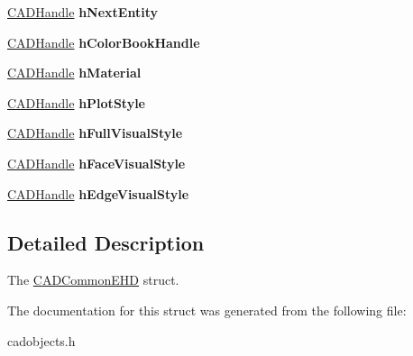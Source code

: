 \begin{DoxyCompactItemize}
\item 
\hyperlink{class_c_a_d_handle}{C\+A\+D\+Handle} {\bfseries h\+Next\+Entity}\hypertarget{struct_c_a_d_common_e_h_d_ac566a87a33ed49b272b8647fcd54a4b7}{}\label{struct_c_a_d_common_e_h_d_ac566a87a33ed49b272b8647fcd54a4b7}

\item 
\hyperlink{class_c_a_d_handle}{C\+A\+D\+Handle} {\bfseries h\+Color\+Book\+Handle}\hypertarget{struct_c_a_d_common_e_h_d_a94a69a18e50c11a6d08ab9cd23ffafe5}{}\label{struct_c_a_d_common_e_h_d_a94a69a18e50c11a6d08ab9cd23ffafe5}

\item 
\hyperlink{class_c_a_d_handle}{C\+A\+D\+Handle} {\bfseries h\+Material}\hypertarget{struct_c_a_d_common_e_h_d_a9ebf2ff0ac69686bd6d818362245021d}{}\label{struct_c_a_d_common_e_h_d_a9ebf2ff0ac69686bd6d818362245021d}

\item 
\hyperlink{class_c_a_d_handle}{C\+A\+D\+Handle} {\bfseries h\+Plot\+Style}\hypertarget{struct_c_a_d_common_e_h_d_afe482d65b2cba4333eb074f8aa4408f6}{}\label{struct_c_a_d_common_e_h_d_afe482d65b2cba4333eb074f8aa4408f6}

\item 
\hyperlink{class_c_a_d_handle}{C\+A\+D\+Handle} {\bfseries h\+Full\+Visual\+Style}\hypertarget{struct_c_a_d_common_e_h_d_a8f04a2c251fe0d108bb15af536a31420}{}\label{struct_c_a_d_common_e_h_d_a8f04a2c251fe0d108bb15af536a31420}

\item 
\hyperlink{class_c_a_d_handle}{C\+A\+D\+Handle} {\bfseries h\+Face\+Visual\+Style}\hypertarget{struct_c_a_d_common_e_h_d_ae6f83c99d7023cc1634abd0709fb48c3}{}\label{struct_c_a_d_common_e_h_d_ae6f83c99d7023cc1634abd0709fb48c3}

\item 
\hyperlink{class_c_a_d_handle}{C\+A\+D\+Handle} {\bfseries h\+Edge\+Visual\+Style}\hypertarget{struct_c_a_d_common_e_h_d_aab85327e9b9917642286489ec5ae903f}{}\label{struct_c_a_d_common_e_h_d_aab85327e9b9917642286489ec5ae903f}

\end{DoxyCompactItemize}


\subsection{Detailed Description}
The \hyperlink{struct_c_a_d_common_e_h_d}{C\+A\+D\+Common\+E\+HD} struct. 

The documentation for this struct was generated from the following file\+:\begin{DoxyCompactItemize}
\item 
cadobjects.\+h\end{DoxyCompactItemize}

